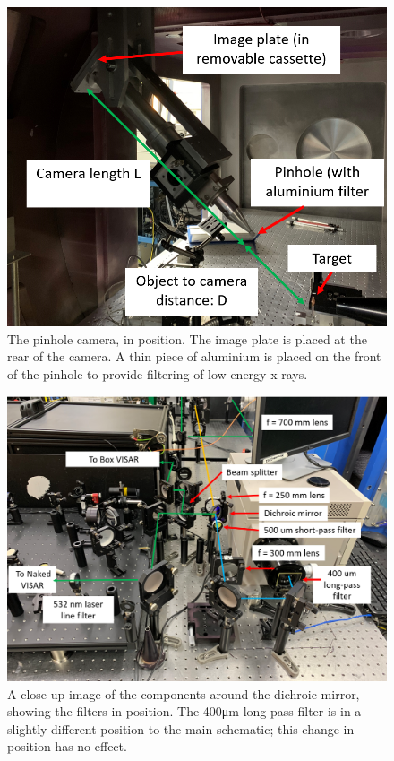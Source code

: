 \begin{figure}
\begin{centering}
\includegraphics[width=1.0\textwidth]{figures/AppendixExperiment/Pinhole.png}%
\caption{\label{fig:Appx-Pinhole} The pinhole camera, in position. The image plate is placed at the rear of the camera. A thin piece of aluminium is placed on the front of the pinhole to provide filtering of low-energy x-rays. }
\end{centering}
\end{figure}

\begin{figure}
\begin{centering}
\includegraphics[width=1.0\textwidth]{figures/AppendixExperiment/DichroicCloseUp.png}%
\caption{\label{fig:Appx-Dichroic} A close-up image of the components around the dichroic mirror, showing the filters in position. The 400\unit{\micro\meter} long-pass filter is in a slightly different position to the main schematic; this change in position has no effect.}
\end{centering}
\end{figure}

